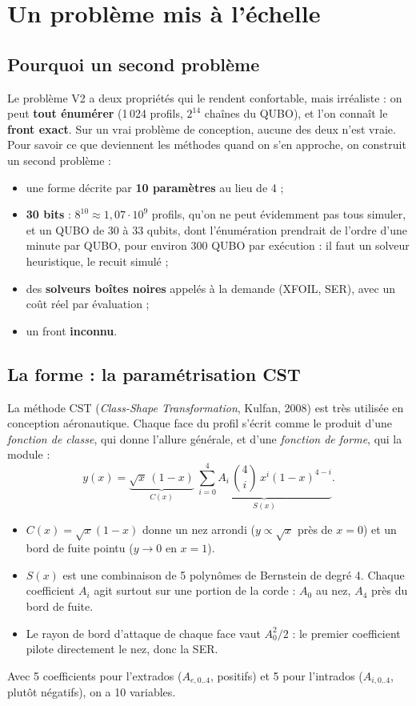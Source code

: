 \chapter{Un problème mis à l'échelle}\label{ch:echelle}

\section{Pourquoi un second problème}
Le problème V2 a deux propriétés qui le rendent confortable, mais irréaliste : on peut \textbf{tout énumérer} (1\,024 profils, $2^{14}$ chaînes du QUBO), et l'on connaît le \textbf{front exact}. Sur un vrai problème de conception, aucune des deux n'est vraie. Pour savoir ce que deviennent les méthodes quand on s'en approche, on construit un second problème :
\begin{itemize}
\item une forme décrite par \textbf{10 paramètres} au lieu de 4 ;
\item \textbf{30 bits} : $8^{10}\approx1{,}07\cdot10^9$ profils, qu'on ne peut évidemment pas tous simuler, et un QUBO de 30 à 33 qubits, dont l'énumération prendrait de l'ordre d'une minute par QUBO, pour environ 300 QUBO par exécution : il faut un solveur heuristique, le recuit simulé ;
\item des \textbf{solveurs boîtes noires} appelés à la demande (XFOIL, SER), avec un coût réel par évaluation ;
\item un front \textbf{inconnu}.
\end{itemize}

\section{La forme : la paramétrisation CST}
La méthode CST (\emph{Class-Shape Transformation}, Kulfan, 2008) est très utilisée en conception aéronautique. Chaque face du profil s'écrit comme le produit d'une \emph{fonction de classe}, qui donne l'allure générale, et d'une \emph{fonction de forme}, qui la module :
\[ y(x)=\underbrace{\sqrt x\,(1-x)}_{C(x)}\ \underbrace{\sum_{i=0}^{4}A_i\,\binom4i\,x^i(1-x)^{4-i}}_{S(x)}. \]
\begin{itemize}
\item $C(x)=\sqrt x(1-x)$ donne un nez arrondi ($y\propto\sqrt x$ près de $x=0$) et un bord de fuite pointu ($y\to0$ en $x=1$).
\item $S(x)$ est une combinaison de 5 polynômes de Bernstein de degré 4. Chaque coefficient $A_i$ agit surtout sur une portion de la corde : $A_0$ au nez, $A_4$ près du bord de fuite.
\item Le rayon de bord d'attaque de chaque face vaut $A_0^2/2$ : le premier coefficient pilote directement le nez, donc la SER.
\end{itemize}
Avec 5 coefficients pour l'extrados ($A_{e,0..4}$, positifs) et 5 pour l'intrados ($A_{i,0..4}$, plutôt négatifs), on a 10 variables.

